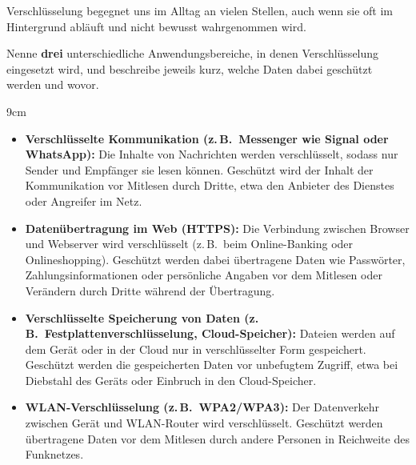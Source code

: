 \question[3]
Verschlüsselung begegnet uns im Alltag an vielen Stellen, auch wenn 
sie oft im Hintergrund abläuft und nicht bewusst wahrgenommen wird.

Nenne \textbf{drei} unterschiedliche Anwendungsbereiche, in denen 
Verschlüsselung eingesetzt wird, und beschreibe jeweils kurz, welche 
Daten dabei geschützt werden und wovor.

\begin{solutionbox}{9cm}

\begin{itemize}
    \item \textbf{Verschlüsselte Kommunikation (z.\,B.\ Messenger wie 
    Signal oder WhatsApp):} Die Inhalte von Nachrichten werden 
    verschlüsselt, sodass nur Sender und Empfänger sie lesen können. 
    Geschützt wird der Inhalt der Kommunikation vor Mitlesen durch 
    Dritte, etwa den Anbieter des Dienstes oder Angreifer im Netz.
    
    \item \textbf{Datenübertragung im Web (HTTPS):} Die Verbindung 
    zwischen Browser und Webserver wird verschlüsselt (z.\,B.\ beim 
    Online-Banking oder Onlineshopping). Geschützt werden dabei 
    übertragene Daten wie Passwörter, Zahlungsinformationen oder 
    persönliche Angaben vor dem Mitlesen oder Verändern durch Dritte 
    während der Übertragung.
    
    \item \textbf{Verschlüsselte Speicherung von Daten 
    (z.\,B.\ Festplattenverschlüsselung, Cloud-Speicher):} Dateien 
    werden auf dem Gerät oder in der Cloud nur in verschlüsselter Form 
    gespeichert. Geschützt werden die gespeicherten Daten vor unbefugtem 
    Zugriff, etwa bei Diebstahl des Geräts oder Einbruch in den 
    Cloud-Speicher.
    
    \item \textbf{WLAN-Verschlüsselung (z.\,B.\ WPA2/WPA3):} Der 
    Datenverkehr zwischen Gerät und WLAN-Router wird verschlüsselt. 
    Geschützt werden übertragene Daten vor dem Mitlesen durch andere 
    Personen in Reichweite des Funknetzes.
\end{itemize}

\end{solutionbox}


